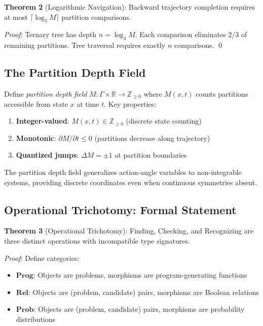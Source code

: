 \documentclass[twocolumn,aps,prl,superscriptaddress,floatfix]{revtex4-2}
\begin{document}
\textbf{Theorem 2} (Logarithmic Navigation): Backward trajectory completion requires at most $\lceil \log_3 M \rceil$ partition comparisons.

\textit{Proof}: Ternary tree has depth $n = \log_3 M$. Each comparison eliminates $2/3$ of remaining partitions. Tree traversal requires exactly $n$ comparisons. \qed

\subsection{The Partition Depth Field}

Define \emph{partition depth field} $M: \Gamma \times \mathbb{R} \to \mathbb{Z}_{\geq 0}$ where $M(x,t)$ counts partitions accessible from state $x$ at time $t$. Key properties:

\begin{enumerate}
\item \textbf{Integer-valued}: $M(x,t) \in \mathbb{Z}_{\geq 0}$ (discrete state counting)
\item \textbf{Monotonic}: $\partial M/\partial t \leq 0$ (partitions decrease along trajectory)
\item \textbf{Quantized jumps}: $\Delta M = \pm 1$ at partition boundaries
\end{enumerate}

The partition depth field generalizes action-angle variables to non-integrable systems, providing discrete coordinates even when continuous symmetries absent.

\subsection{Operational Trichotomy: Formal Statement}

\textbf{Theorem 3} (Operational Trichotomy): Finding, Checking, and Recognizing are three distinct operations with incompatible type signatures.

\textit{Proof}: Define categories:
\begin{itemize}
\item $\mathbf{Prog}$: Objects are problems, morphisms are program-generating functions
\item $\mathbf{Rel}$: Objects are (problem, candidate) pairs, morphisms are Boolean relations
\item $\mathbf{Prob}$: Objects are (problem, candidate) pairs, morphisms are probability distributions
\end{itemize}
\end{document}
